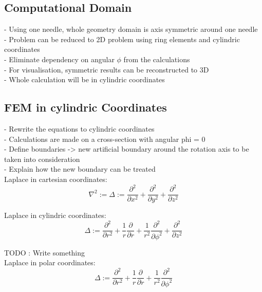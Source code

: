 \documentclass[parskip=half, titlepage=yes, 12pt, BCOR=12mm, DIV=calc]{scrartcl}
\begin{document}
\subsection{Computational Domain}
- Using one needle, whole geometry domain is axis symmetric around one needle \\
- Problem can be reduced to 2D problem using ring elements and cylindric coordinates \\
- Eliminate dependency on angular $\phi$ from the calculations \\
- For visualisation, symmetric results can be reconstructed to 3D \\
- Whole calculation will be in cylindric coordinates \\

\subsection{FEM in cylindric Coordinates}
- Rewrite the equations to cylindric coordinates \\
- Calculations are made on a cross-section with angular phi = 0 \\
- Define boundaries -> new artificial boundary around the rotation axis to be taken into consideration \\
- Explain how the new boundary can be treated \\
 
Laplace in cartesian coordinates:
\begin{equation}
    \nabla^2 := \Delta := \frac{\partial^2}{\partial x^2} + \frac{\partial^2}{\partial y^2} + \frac{\partial^2}{\partial z^2}
\end{equation}

Laplace in cylindric coordinates:
\begin{equation}
    \Delta := \frac{\partial^2}{\partial r^2} + \frac{1}{r} \frac{\partial}{\partial r} + \frac{1}{r^2} \frac{\partial^2}{\partial \phi^2} + \frac{\partial^2}{\partial z^2}
\end{equation}

TODO : Write something \\

Laplace in polar coordinates:
\begin{equation}
    \Delta := \frac{\partial^2}{\partial r^2} + \frac{1}{r} \frac{\partial}{\partial r} + \frac{1}{r^2} \frac{\partial^2}{\partial \phi^2}
\end{equation}
\end{document}
